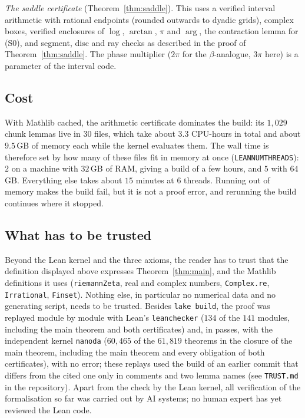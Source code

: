 \documentclass[11pt]{amsart}
\theoremstyle{definition}
\theoremstyle{remark}
\numberwithin{equation}{section}
\newcommand{\lean}[1]{{\def\_{\textunderscore\allowbreak}\texttt{#1}}}
\begin{document}
\emph{The saddle certificate} (Theorem~\ref{thm:saddle}). This uses a verified interval arithmetic with rational
endpoints (rounded outwards to dyadic grids), complex boxes, verified enclosures of $\log$, $\arctan$, $\pi$ and
$\arg$, the contraction lemma for (S0), and segment, disc and ray checks as described in the proof of
Theorem~\ref{thm:saddle}. The phase multiplier ($2\pi$ for the $\beta$-analogue, $3\pi$ here) is a parameter of the
interval code.

\subsection{Cost}
With Mathlib cached, the arithmetic certificate dominates the build: its $1{,}029$ chunk lemmas live in $30$ files,
which take about $3.3$ CPU-hours in total and about $9.5$\,GB of memory each while the kernel evaluates them. The wall
time is therefore set by how many of these files fit in memory at once (\lean{LEAN\_NUM\_THREADS}): $2$ on a machine with
$32$\,GB of RAM, giving a build of a few hours, and $5$ with $64$\,GB. Everything else takes about $15$ minutes at $6$
threads. Running out of memory makes the build fail, but it is not a proof error, and rerunning the build continues
where it stopped.

\subsection{What has to be trusted}
Beyond the Lean kernel and the three axioms, the reader has to trust that the definition displayed above expresses
Theorem~\ref{thm:main}, and the Mathlib definitions it uses (\lean{riemannZeta}, real and complex numbers,
\lean{Complex.re}, \lean{Irrational}, \lean{Finset}). Nothing else, in particular no numerical data and no generating
script, needs to be trusted. Besides \lean{lake build}, the proof was replayed module by module with Lean's
\lean{leanchecker} ($134$ of the $141$ modules, including the main theorem and both certificates) and, in passes, with
the independent kernel \lean{nanoda} ($60{,}465$ of the $61{,}819$ theorems in the closure of the main theorem,
including the main theorem and every obligation of both certificates), with no error; these replays used the build of
an earlier commit that differs from the cited one only in comments and two lemma names (see \lean{TRUST.md} in the
repository). Apart from the check by the Lean kernel, all verification of the formalisation so far
was carried out by AI systems; no human expert has yet reviewed the Lean code.
\end{document}
